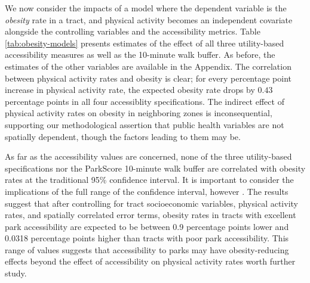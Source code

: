 \documentclass[Afour,sageh.bst]{sagej}
\begin{document}
We now consider the impacts of a model where the dependent variable is
the \emph{obesity} rate in a tract, and physical activity becomes an
independent covariate alongside the controlling variables and the
accessibility metrics. Table \ref{tab:obesity-models} presents estimates
of the effect of all three utility-based accessibility measures as well
as the 10-minute walk buffer. As before, the estimates of the other
variables are available in the Appendix. The correlation between
physical activity rates and obesity is clear; for every percentage point
increase in physical activity rate, the expected obesity rate drops by
\(0.43\) percentage points in all four accessiblity specifications. The
indirect effect of physical activity rates on obesity in neighboring
zones is inconsequential, supporting our methodological assertion that
public health variables are not spatially dependent, though the factors
leading to them may be.

As far as the accessibility values are concerned, none of the three
utility-based specifications nor the ParkScore 10-minute walk buffer are
correlated with obesity rates at the traditional 95\% confidence
interval. It is important to consider the implications of the full range
of the confidence interval, however \citep{Amrhein2019}. The results
suggest that after controlling for tract socioeconomic variables,
physical activity rates, and spatially correlated error terms, obesity
rates in tracts with excellent park accessibility are expected to be
between 0.9 percentage points lower and 0.0318 percentage points higher
than tracts with poor park accessibility. This range of values suggests
that accessibility to parks may have obesity-reducing effects beyond the
effect of accessibility on physical activity rates worth further study.
\end{document}
